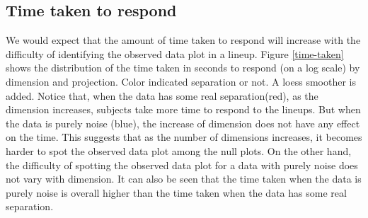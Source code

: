 
\subsection{Time taken to respond}

We would expect that the amount of time taken to respond will increase with the difficulty of identifying the observed data plot in a lineup. Figure \ref{time-taken} shows the distribution of the time taken in seconds to respond (on a log scale) by dimension and projection. Color indicated separation or not. A loess smoother is added. Notice that,  when the data has some real separation(red), as the dimension increases, subjects take more time to respond to the lineups. But when the data is purely noise (blue), the increase of dimension does not have any effect on the time. This suggests that as the number of dimensions increases, it becomes harder to spot the observed data plot among the null plots. On the other hand, the difficulty of spotting the observed data plot for a data with purely noise does not vary with dimension. It can also be seen that the time taken when the data is purely noise is overall higher than the time taken when the data has some real separation. 



